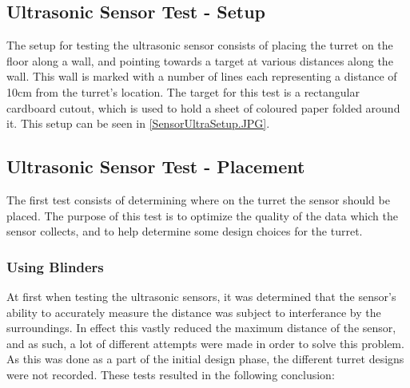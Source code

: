 
\subsection{Ultrasonic Sensor Test - Setup}\label{UltraTestSetup}
The setup for testing the ultrasonic sensor consists of placing the turret on
the floor along a wall, and pointing towards a target at various distances along
the wall. This wall is marked with a number of lines each representing a
distance of 10cm from the turret's location. The target for this test is a
rectangular cardboard cutout, which is used to hold a sheet of coloured paper
folded around it. This setup can be seen in \autoref{SensorUltraSetup.JPG}.


\subsection{Ultrasonic Sensor Test - Placement}\label{UltraTestPlacement}
The first test consists of determining where on the turret the sensor should be
placed. The purpose of this test is to optimize the quality of the data which
the sensor collects, and to help determine some design choices for the
turret.\nl


\subsubsection{Using Blinders}
At first when testing the ultrasonic sensors, it was determined that the
sensor's ability to accurately measure the distance was subject to interferance
by the surroundings. In effect this vastly reduced the maximum distance of the
sensor, and as such, a lot of different attempts were made in order to solve
this problem. As this was done as a part of the initial design phase, the
different turret designs were not recorded. These tests resulted in the
following conclusion:\nl

